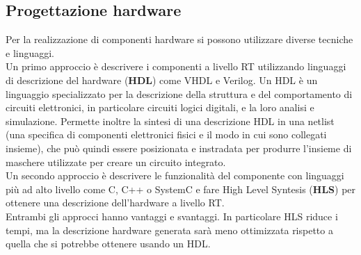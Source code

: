 \documentclass[]{IEEEtran}
\begin{document}
\subsection{Progettazione hardware}
Per la realizzazione di componenti hardware si possono utilizzare diverse tecniche e linguaggi.
\\Un primo approccio è descrivere i componenti a livello RT utilizzando linguaggi di descrizione del hardware (\textbf{HDL}) come VHDL e Verilog. Un HDL è un linguaggio specializzato per la descrizione della struttura e del comportamento di circuiti elettronici, in particolare circuiti logici digitali, e la loro analisi e simulazione. Permette inoltre la sintesi di una descrizione HDL in una netlist (una specifica di componenti elettronici fisici e il modo in cui sono collegati insieme), che può quindi essere posizionata e instradata per produrre l'insieme di maschere utilizzate per creare un circuito integrato\cite{HDL}.
\\Un secondo approccio è descrivere le funzionalità del componente con linguaggi più ad alto livello come C, C++ o SystemC\cite{SystemC} e fare High Level Syntesis (\textbf{HLS}) per ottenere una descrizione dell'hardware a livello RT\cite{HLS}.
\\Entrambi gli approcci hanno vantaggi e svantaggi. In particolare HLS riduce i tempi, ma la descrizione hardware generata sarà meno ottimizzata rispetto a quella che si potrebbe ottenere usando un HDL.
\end{document}

